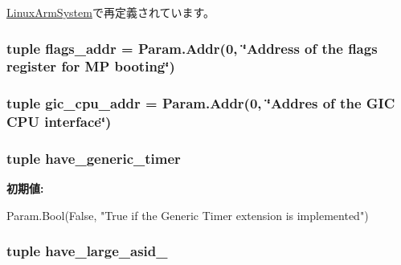 \hyperlink{classArmSystem_1_1LinuxArmSystem_a17da7064bc5c518791f0c891eff05fda}{LinuxArmSystem}で再定義されています。\hypertarget{classArmSystem_1_1ArmSystem_a4cede061071acf32525d725eea7f8436}{
\subsubsection[{flags\_\-addr}]{\setlength{\rightskip}{0pt plus 5cm}tuple flags\_\-addr = {\bf Param.Addr}(0, \char`\"{}Address of the flags register for MP booting\char`\"{})}}
\label{classArmSystem_1_1ArmSystem_a4cede061071acf32525d725eea7f8436}
\hypertarget{classArmSystem_1_1ArmSystem_af795cc7110a0a7211a9b262851de4a36}{
\subsubsection[{gic\_\-cpu\_\-addr}]{\setlength{\rightskip}{0pt plus 5cm}tuple gic\_\-cpu\_\-addr = {\bf Param.Addr}(0, \char`\"{}Addres of the GIC CPU interface\char`\"{})}}
\label{classArmSystem_1_1ArmSystem_af795cc7110a0a7211a9b262851de4a36}
\hypertarget{classArmSystem_1_1ArmSystem_a305b42a51f701d2a5f6e3724d33ee37b}{
\subsubsection[{have\_\-generic\_\-timer}]{\setlength{\rightskip}{0pt plus 5cm}tuple have\_\-generic\_\-timer}}
\label{classArmSystem_1_1ArmSystem_a305b42a51f701d2a5f6e3724d33ee37b}
{\bfseries 初期値:}
\begin{DoxyCode}
Param.Bool(False,
        "True if the Generic Timer extension is implemented")
\end{DoxyCode}
\hypertarget{classArmSystem_1_1ArmSystem_a82887e1e3de3c3e0d28910b1604ab61a}{
\subsubsection[{have\_\-large\_\-asid\_\-64}]{\setlength{\rightskip}{0pt plus 5cm}tuple have\_\-large\_\-asid\_}}
